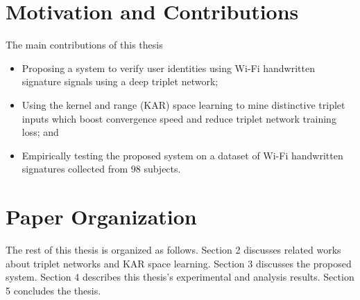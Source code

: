 \newpage
\section{Motivation and Contributions}
The main contributions of this thesis
\begin{itemize}
\item Proposing a system to verify user identities using Wi-Fi handwritten signature signals using a deep triplet network;
\item Using the kernel and range (KAR) space learning to mine distinctive triplet inputs which boost convergence speed and reduce triplet network training loss; and
\item Empirically testing the proposed system on a dataset of Wi-Fi handwritten signatures collected from 98 subjects.
\end{itemize}

\section{Paper Organization}
The rest of this thesis is organized as follows.  Section 2 discusses related works about triplet networks and KAR space learning. Section 3 discusses the proposed system. Section 4 describes this thesis's experimental and analysis results. Section 5 concludes the thesis. 
